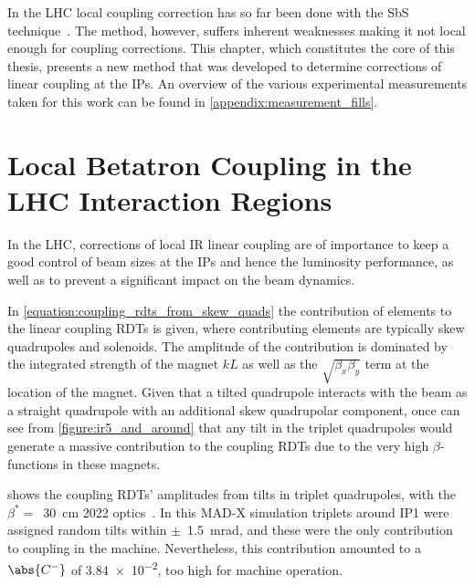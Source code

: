 In the LHC local coupling correction has so far been done with the SbS technique~\cite{PRAB:Tomas:CERN_LHC_OMC}.
The method, however, suffers inherent weaknesses making it not local enough for coupling corrections.
This chapter, which constitutes the core of this thesis, presents a new method that was developed to determine corrections of linear coupling at the IPs.
An overview of the various experimental measurements taken for this work can be found in \cref{appendix:measurement_fills}.


\section{Local Betatron Coupling in the LHC Interaction Regions}
\label{section:local_ir_coupling}

In the LHC, corrections of local IR linear coupling are of importance to keep a good control of beam sizes at the IPs and hence the luminosity performance, as well as to prevent a significant impact on the beam dynamics.

In \cref{equation:coupling_rdts_from_skew_quads} the contribution of elements to the linear coupling RDTs is given, where contributing elements are typically skew quadrupoles and solenoids.
The amplitude of the contribution is dominated by the integrated strength of the magnet \(k L\) as well as the \(\sqrt{\beta_x \beta_y}\) term at the location of the magnet.
Given that a tilted quadrupole interacts with the beam as a straight quadrupole with an additional skew quadrupolar component, once can see from \cref{figure:ir5_and_around} that any tilt in the triplet quadrupoles would generate a massive contribution to the coupling RDTs due to the very high \(\beta\)-functions in these magnets.

 shows the coupling RDTs' amplitudes from tilts in triplet quadrupoles, with the \(\beta^{\ast} =\)~\qty{30}{\centi\meter} \num{2022} optics~\cite{CODE:acc-models-lhc}.
In this MAD-X simulation triplets around IP\num{1} were assigned random tilts within \(\pm\)~\qty{1.5}{\milli\radian}, and these were the only contribution to coupling in the machine.
Nevertheless, this contribution amounted to a \(\abs{C^{-}}\) of \num{3.84e-2}, too high for machine operation.

